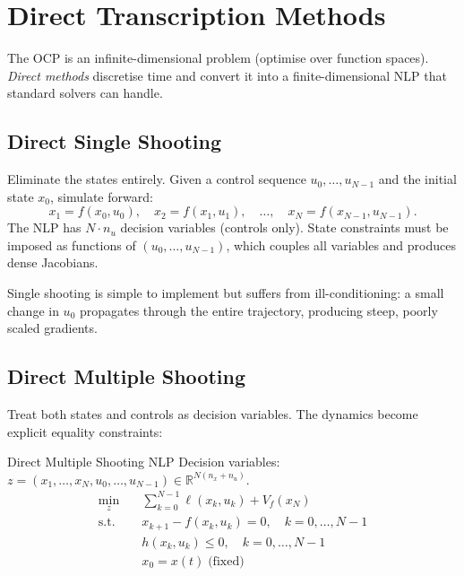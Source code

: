 \section{Direct Transcription Methods}
\label{sec:direct_transcription}

The OCP is an infinite-dimensional problem (optimise over function spaces). \emph{Direct methods} discretise time and convert it into a finite-dimensional NLP that standard solvers can handle.

\subsection{Direct Single Shooting}

Eliminate the states entirely. Given a control sequence $u_0, \dots, u_{N-1}$ and the initial state $x_0$, simulate forward:
\[
x_1 = f(x_0, u_0), \quad x_2 = f(x_1, u_1), \quad \dots, \quad x_N = f(x_{N-1}, u_{N-1}).
\]
The NLP has $N \cdot n_u$ decision variables (controls only). State constraints must be imposed as functions of $(u_0, \dots, u_{N-1})$, which couples all variables and produces dense Jacobians.

Single shooting is simple to implement but suffers from ill-conditioning: a small change in $u_0$ propagates through the entire trajectory, producing steep, poorly scaled gradients.

\subsection{Direct Multiple Shooting}

Treat both states and controls as decision variables. The dynamics become explicit equality constraints:

\begin{defnbox}{Direct Multiple Shooting NLP}
	Decision variables: $z = (x_1, \dots, x_N, u_0, \dots, u_{N-1}) \in \mathbb{R}^{N(n_x + n_u)}$.
	\begin{align*}
		\min_z \quad & \sum_{k=0}^{N-1} \ell(x_k, u_k) + V_f(x_N) \\
		\text{s.t.} \quad & x_{k+1} - f(x_k, u_k) = 0, \quad k = 0, \dots, N{-}1 \\
		& h(x_k, u_k) \le 0, \quad k = 0, \dots, N{-}1 \\
		& x_0 = x(t) \;\text{(fixed)}
	\end{align*}
\end{defnbox}

